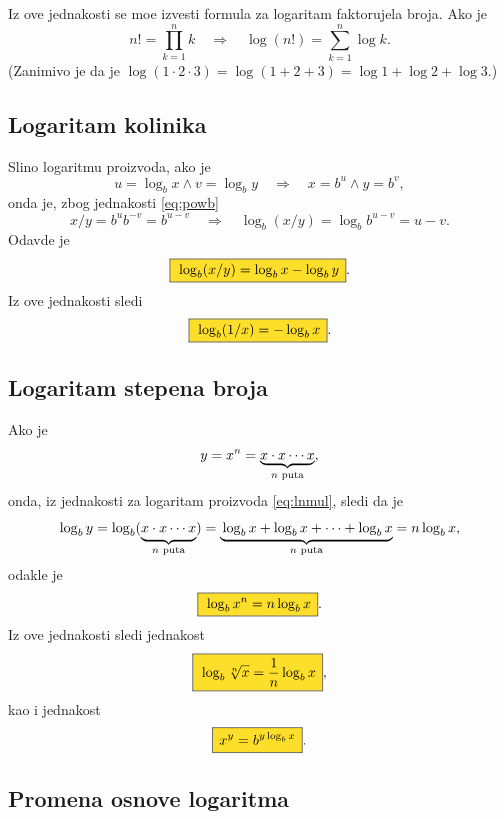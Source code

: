 \documentclass[12pt, twoside, a4paper]{article}
\def\logb{\log_b}
\def\okvir#1{\fcolorbox{black}{Goldenrod}{$\,\displaystyle{\mathstrut #1}\,$}}
\def\sledi{{\quad\Rightarrow\quad}}
\begin{document}
Iz ove jednakosti se mo{\zv}e izvesti formula za logaritam faktorujela broja. Ako je
$$
n!=\prod_{k=1}^n k\sledi \log(n!)=\sum_{k=1}^n\log k.
$$
(Zanim{\lj}ivo je da je $\log(1\cdot2\cdot3)=\log(1+2+3)=\log1+\log2+\log3$.)


\subsection{Logaritam koli{\cv}nika}

Sli{\cv}no logaritmu proizvoda, 
ako je
$$
u=\logb x\land v=\log_b y \sledi x=b^u\land y=b^v,
$$
onda je, zbog jednakosti \eqref{eq:powb}
$$
x/ y=b^ub^{-v}=b^{u-v}\sledi \logb(x/y)=\logb b^{u-v}=u-v.
$$
Odavde je
\begin{equation}
\okvir{\logb(x/ y)=\logb x-\logb y}.
\label{eq:lndiv}
\end{equation}
Iz ove jednakosti sledi
\begin{equation}
\okvir{\logb(1/x)=-\logb x}.
\label{eq:recip}
\end{equation}

\subsection{Logaritam stepena broja}

Ako je
$$
y=x^n=\underbrace{x\cdot x\cdots x}_{\text{$\mathstrut n$ puta}},
$$
onda, iz jednakosti za logaritam proizvoda \eqref{eq:lnmul}, sledi da je
$$
\logb y=\logb (\underbrace{\mathstrut x\cdot x\cdots x}_{\text{$n$ puta}})
=\underbrace{\mathstrut \logb x+\logb x+\cdots+\logb x}_{\text{$n$ puta}}
=n\logb x,
$$
odakle je
\begin{equation}
\okvir{\logb x^n=n\logb x}.
\label{eq:bpow}
\end{equation}
Iz ove jednakosti sledi jednakost
\begin{equation}
\okvir{\logb\sqrt[n] x=\frac1n\logb x},
\label{eq:lnroot}
\end{equation}
kao i jednakost
\begin{equation}
\okvir{x^y=b^{y\logb x}}.
\label{eq:power}
\end{equation}


\subsection{Promena osnove logaritma}
\end{document}
